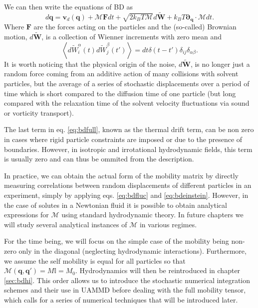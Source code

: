\documentclass[ twoside,openright,titlepage,numbers=noenddot,%
headinclude,footinclude,cleardoublepage=empty,abstract=on,
BCOR=5mm,paper=a4,fontsize=11pt, dvipsnames
]{scrreprt}
\renewcommand{\vec}[1]{\bm{#1}}
\newcommand{\tens}[1]{\bm{\mathcal{#1}}}
\newcommand{\uammd}{\gls{UAMMD}\xspace}
\newcommand{\kT}{k_B T}
\newcommand{\noise}{\widetilde{W}}
\newcommand{\ppos}{q}
\begin{document}
We can then write the equations of \gls{BD} as
\begin{equation}
  \label{eq:bdfull}
  d\vec{\ppos} = \vec{v}_d(\vec{\ppos}) + \tens{M}\vec{F}dt + \sqrt{2\kT\tens{M}}d\vec{\noise} + \kT\vec{\partial}_{\vec{\ppos}}\cdot\tens{M}dt.
\end{equation}
Where $\vec{F}$ are the forces acting on the particles and the (so-called) Brownian motion, $d\vec{\noise}$, is a collection of Wienner increments with zero mean and
\begin{equation}
\left\langle d\noise_{i}^\alpha(t)d\noise_{j}^\beta(t') \right\rangle = dt\delta(t-t')\delta_{ij}\delta_{\alpha\beta}.
\end{equation}
It is worth noticing that the physical origin of the noise, $d\vec{\noise}$, is no longer just a random force coming from an additive action of many collisions with solvent particles, but the average of a series of stochastic displacements over a period of time which is short compared to the diffusion time of one particle (but long compared with the relaxation time of the solvent velocity fluctuations via sound or vorticity transport).

The last term in eq. \eqref{eq:bdfull}, known as the thermal drift term, can be non zero in cases where rigid particle constraints are imposed\cite{Westwood2021} or due to the presence of boundaries\cite{Pelaez2018,Balboa2016,Buscalioni}. However, in isotropic and irrotational hydrodynamic fields, this term is usually zero and can thus be ommited from the description.

In practice, we can obtain the actual form of the mobility matrix by directly measuring correlations between random displacements of different particles\cite{Panzuela2018} in an experiment, simply by applying eqs. \eqref{eq:bdfluc} and \eqref{eq:bdeinstein}. However, in the case of solutes in a Newtonian fluid it is possible to obtain analytical expressions for $\tens{M}$ using standard hydrodynamic theory. In future chapters we will study several analytical instances of $\tens{M}$ in various regimes.

For the time being, we will focus on the simple case of the mobility being non-zero only in the diagonal (neglecting hydrodynamic interactions). Furthermore, we assume the self mobility is equal for all particles so that $\tens{M}(\vec{\ppos}, \vec{\ppos}') = M\mathbb{I} = M_0$. Hydrodynamics will then be reintroduced in chapter \ref{sec:bdhi}. This order allows us to introduce the stochastic numerical integration schemes and their use in \uammd before dealing with the full mobility tensor, which calls for a series of numerical techniques that will be introduced later.
\end{document}
